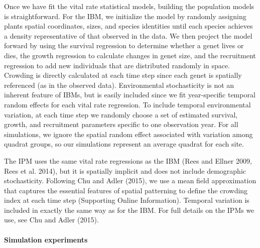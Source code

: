 \documentclass[12pt,]{article}
\begin{document}
Once we have fit the vital rate statistical models, building the
population models is straightforward. For the IBM, we initialize the
model by randomly assigning plants spatial coordinates, sizes, and
species identities until each species achieves a density representative
of that observed in the data. We then project the model forward by using
the survival regression to determine whether a genet lives or dies, the
growth regression to calculate changes in genet size, and the
recruitment regression to add new individuals that are distributed
randomly in space. Crowding is directly calculated at each time step
since each genet is spatially referenced (as in the observed data).
Environmental stochasticity is not an inherent feature of IBMs, but is
easily included since we fit year-specific temporal random effects for
each vital rate regression. To include temporal environmental variation,
at each time step we randomly choose a set of estimated survival,
growth, and recruitment parameters specific to one observation year. For
all simulations, we ignore the spatial random effect associated with
variation among quadrat groups, so our simulations represent an average
quadrat for each site.

The IPM uses the same vital rate regressions as the IBM (Rees and Ellner
2009, Rees et al. 2014), but it is spatially implicit and does not
include demographic stochasticity. Following Chu and Adler (2015), we
use a mean field approximation that captures the essential features of
spatial patterning to define the crowding index at each time step
(Supporting Online Information). Temporal variation is included in
exactly the same way as for the IBM. For full details on the IPMs we
use, see Chu and Adler (2015).

\paragraph{Simulation experiments}\label{simulation-experiments}
\end{document}
